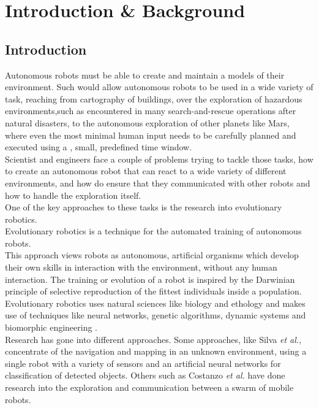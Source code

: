 \chapter{Introduction \& Background}

\section{Introduction}
Autonomous robots must be able to create and maintain a models of their environment. Such would allow autonomous robots to be used in a wide variety of task, reaching from cartography of buildings, over the exploration of hazardous environments,such as encountered in many search-and-rescue operations after natural disasters, to the autonomous exploration of other planets like Mars, where even the most minimal human input needs to be carefully planned and executed using a , small, predefined time window. \\

Scientist and engineers face a couple of problems trying to tackle those tasks, how to create an autonomous robot that can react to a wide variety of different environments, and how do ensure that they communicated with other robots and how to handle the exploration itself.\\
One of the key approaches to these tasks is the research into evolutionary robotics. \\
Evolutionary robotics is a technique for the automated training of autonomous robots. \\
This approach views robots as autonomous, artificial organisms which develop their own skills in interaction with the environment, without any human interaction.
The training or evolution of a robot is inspired by the Darwinian principle of selective reproduction of the fittest individuals inside a population. Evolutionary robotics uses natural sciences like biology and ethology and makes use of techniques like neural networks, genetic algorithms, dynamic systems and biomorphic engineering \cite{nolfi2000evolutionary}.\\
Research has gone into different approaches. Some approaches, like Silva \textit{et al.}\cite{Silva2008}, concentrate of the navigation and mapping in an unknown environment, using a single robot with a variety of sensors and an  artificial neural networks for classification of detected objects. Others such as Costanzo \textit{et al.}\cite{Costanzo20121047} have done research into the exploration and communication between a swarm of mobile robots.\\

